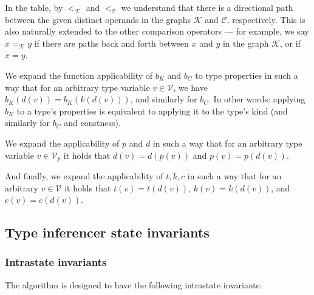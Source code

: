 In the table, by $<_{\mathcal{K}}$ and $<_{\mathcal{C}}$ we understand that there is a directional path between the given distinct operands in the graphs $\mathcal{K}$ and $\mathcal{C}$, respectively. This is also naturally extended to the other comparison operators --- for example, we say $x =_{\mathcal{K}} y$ if there are paths back and forth between $x$ and $y$ in the graph $\mathcal{K}$, or if $x = y$.


\begin{defn}
    We expand the function applicability of $b_K$ and $b_C$ to type properties in such a way that for an arbitrary type variable $v \in \mathcal{V}$, we have $b_K (d (v)) = b_K (k (d (v)))$, and similarly for $b_C$. In other words: applying $b_K$ to a type's properties is equivalent to applying it to the type's kind (and similarly for $b_C$ and constness).

    We expand the applicability of $p$ and $d$ in such a way that for an arbitrary type variable $v \in \mathcal{V}_p$ it holds that $d(v) = d(p(v))$ and $p(v) = p(d(v))$.

    And finally, we expand the applicability of $t, k, c$ in such a way that for an arbitrary $v \in \mathcal{V}$ it holds that $t (v) = t (d (v))$, $k (v) = k (d (v))$, and $c (v) = c (d (v))$.
\end{defn}

\subsection{Type inferencer state invariants}

\subsubsection{Intrastate invariants}

The algorithm is designed to have the following intrastate invariants:


